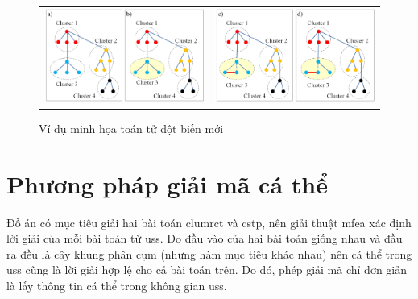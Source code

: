 \renewcommand{\scalefigure}{0.26}
\begin{figure}[htb]
	\centering	
	\setlength\tabcolsep{0 pt}
	\begin{tabular}{cc}
		\includegraphics[scale=\scalefigure]{Pictures/Mutation/Mutation_a_b.png} & 	
		\includegraphics[scale=\scalefigure]{Pictures/Mutation/Mutation_c_d.png} \\
	\end{tabular}
	\centering
	\caption{Ví dụ minh họa toán tử đột biến mới}
	\label{fig:Illustation_of_new_mutation_operator}
\end{figure}


\section{Phương pháp giải mã cá thể} \label{chap_mfeaProposed:sec:dexuatgiaima}
Đồ án có mục tiêu giải hai bài toán \gls{clumrct} và \gls{cstp}, nên giải thuật \gls{mfea} xác định lời giải của mỗi bài toán từ \gls{uss}. Do đầu vào của hai bài toán giống nhau và đầu ra đều là cây khung phân cụm (nhưng hàm mục tiêu khác nhau) nên cá thể trong \gls{uss} cũng là lời giải hợp lệ cho cả bài toán trên. Do đó, phép  giải mã chỉ đơn giản là lấy thông tin cá thể trong không gian \gls{uss}. 


